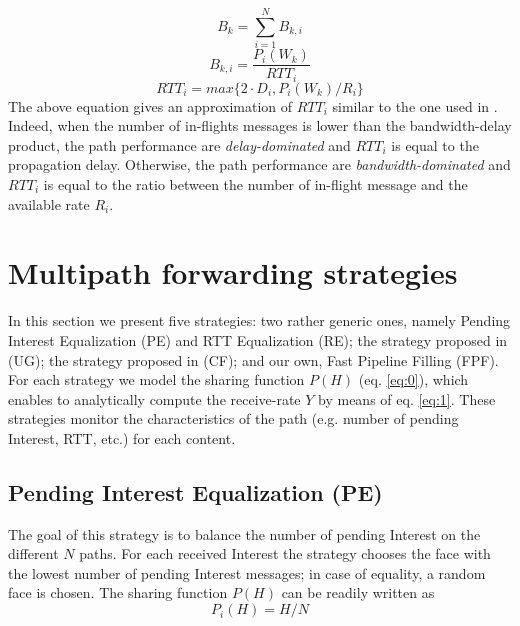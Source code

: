 \documentclass{sig-alternate-10pt}
\begin{document}
\begin{equation}
B_k = \sum_{i=1}^{N} B_{k,i}
\end{equation}
\begin{equation}
B_{k,i} = \frac{P_i(W_k)}{RTT_i}
\label{eq:bki}
\end{equation}
\begin{equation}
RTT_i = max\{2 \cdot D_i, P_i(W_k)/R_i\}
\label{eq:rtt}
\end{equation}
The above equation gives an approximation of $RTT_i$ similar to the one used in \cite{jacobson1988congestion}. Indeed, when the number of in-flights  messages is lower than the bandwidth-delay product, the path performance are \emph{delay-dominated} and $RTT_i$ is equal to the propagation delay. Otherwise, the path performance are \emph{bandwidth-dominated} and $RTT_i$ is equal to the ratio between the number of in-flight message and the available rate $R_i$.

\section{Multipath forwarding strategies}
\label{s:ssb}
In this section we present five strategies: two rather generic ones, namely Pending Interest Equalization (PE) and RTT Equalization (RE); the strategy proposed in \cite{udugama} (UG); the strategy proposed in \cite{carofigliooptimal} (CF); and our own, Fast Pipeline Filling (FPF). For each strategy we model the sharing function $P(H)$ (eq. \ref{eq:0}), which enables to analytically compute the receive-rate $Y$ by means of eq. \ref{eq:1}. These strategies monitor the characteristics of the path (e.g. number of pending Interest, RTT, etc.) for each content. 

\subsection{Pending Interest Equalization (PE)}
The goal of this strategy is to balance the number of pending Interest on the different $N$ paths. For each received Interest the strategy chooses the face with the lowest number of pending Interest messages; in case of equality, a random face is chosen. The sharing function $P(H)$ can be readily written as
\begin{equation}
P_i(H) = H/N
\end{equation}
\end{document}
